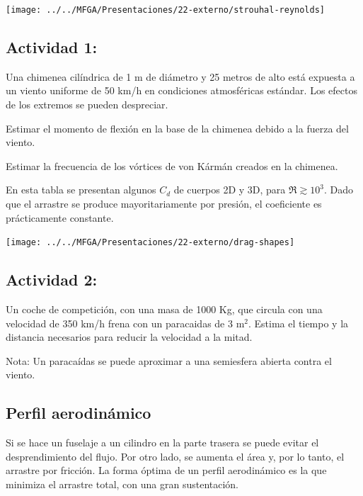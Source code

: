 	\begin{center}
		\texttt{[image: ../../MFGA/Presentaciones/22-externo/strouhal-reynolds]}
	\end{center}
	
	

	
	\subsection*{Actividad 1:}
		Una chimenea cilíndrica de 1 m de diámetro y 25 metros de alto está
		expuesta a un viento uniforme de 50 km/h en condiciones atmosféricas
		estándar. Los efectos de los extremos se pueden despreciar. 
		
		Estimar el momento de flexión en la base de la chimenea debido a la
		fuerza del viento.
		
		Estimar la frecuencia de los vórtices de von Kármán creados en la
		chimenea.


	

		En esta tabla se presentan algunos $C_{d}$ de cuerpos 2D y 3D, para
		$\Re\gtrsim10^{3}$. Dado que el arrastre se produce mayoritariamente
		por presión, el coeficiente es prácticamente constante.%

\begin{center}
	\texttt{[image: ../../MFGA/Presentaciones/22-externo/drag-shapes]}
\end{center}


	
	\subsection*{Actividad 2:}
		Un coche de competición, con una masa de 1000 Kg, que circula con
		una velocidad de 350 km/h frena con un paracaidas de 3 m$^{2}$. Estima
		el tiempo y la distancia necesarios para reducir la velocidad a la
		mitad.
		
		Nota: Un paracaídas se puede aproximar a una semiesfera abierta contra
		el viento. 


\subsection{Perfil aerodinámico}

	
	Si se hace un fuselaje a un cilindro en la parte trasera se puede
	evitar el desprendimiento del flujo. Por otro lado, se aumenta el
	área y, por lo tanto, el arrastre por fricción. La forma óptima de
	un perfil aerodinámico es la que minimiza el arrastre total, con una
	gran sustentación.
	
